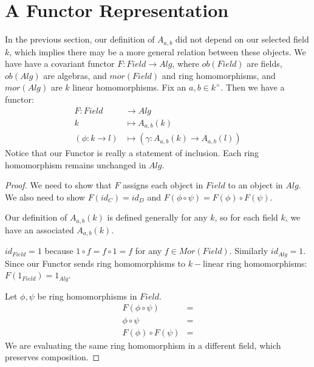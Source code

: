 \documentclass{article}
\begin{document}
\section{A Functor Representation}
In the previous section, our definition of $A_{a,b}$ did not depend on our selected field $k$, which implies there may be a more general relation between these objects. We have have a covariant functor $F: Field \rightarrow Alg$, where $ob(Field)$ are fields, $ob(Alg)$ are algebras, and $mor(Field)$ and ring homomorphisms, and $mor(Alg)$ are $k$ linear homomorphisms. 
Fix an $a,b \in k^{\times}$. Then we have a functor:
\begin{align*}
    F: Field &\rightarrow Alg \\
    k & \mapsto A_{a,b}(k) \\
    (\phi: k \rightarrow l) & \mapsto (\gamma: A_{a,b}(k) \rightarrow A_{a,b}(l))
\end{align*}
Notice that our Functor is really a statement of inclusion. Each ring homomorphism remains unchanged in $Alg$.  
\begin{proof}
We need to show that $F$ assigns each object in $Field$ to an object in $Alg$. We also need to show $F(id_C) = id_D$ and $F(\phi \circ \psi) = F(\phi) \circ F(\psi)$. 

Our definition of $A_{a,b}(k)$ is defined generally for any $k$, so for each field $k$, we have an associated $A_{a,b}(k)$. 

$id_{Field} = 1$ because $1\circ f = f \circ 1 = f$ for any $f \in Mor(Field)$. Similarly $id_{Alg} = 1$. Since our Functor sends ring homomorphisms to $k-$linear ring homomorphisms: $F(1_{Field}) = 1_{Alg}$. 

Let $\phi, \psi$ be ring homomorphisms in $Field$. 
\begin{align*}
    F(\phi \circ \psi) &= \\
    \phi \circ \psi &= \\
    F(\phi) \circ F(\psi) &=
\end{align*}
We are evaluating the same ring homomorphism in a different field, which preserves composition. 
\end{proof}
\end{document}
